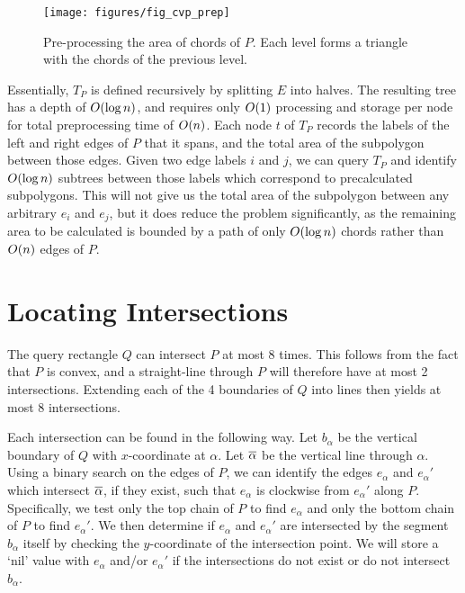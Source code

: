 \begin{figure}[t]
\begin{center}
  \texttt{[image: figures/fig\_cvp\_prep]}
  \caption[Pre-processing the area of chords of $P$.]{Pre-processing the area of chords of $P$.  Each level forms a triangle with the chords of the previous level.}
  \label{fig:convexp:preprocessing}
\end{center}
\end{figure}

Essentially, $T_P$ is defined recursively by splitting $E$ into halves. The resulting tree has a depth of $O\!\left(\log{n}\right)$, and requires only $O\!\left(1\right)$ processing and storage per node for total preprocessing time of $O\!\left(n\right)$. Each node $t$ of $T_P$ records the labels of the left and right edges of $P$ that it spans, and the total area of the subpolygon between those edges. Given two edge labels $i$ and $j$, we can query $T_P$ and identify $O\!\left(\log{n}\right)$ subtrees between those labels which correspond to precalculated subpolygons. This will not give us the total area of the subpolygon between any arbitrary $e_i$ and $e_j$, but it does reduce the problem significantly, as the remaining area to be calculated is bounded by a path of only $O\!\left(\log{n}\right)$ chords rather than $O\!\left(n\right)$ edges of $P$.


\section{Locating Intersections}
\label{:convexp:intersections}

The query rectangle $Q$ can intersect $P$ at most $8$ times. This follows from the fact that $P$ is convex, and a straight-line through $P$ will therefore have at most 2 intersections. Extending each of the 4 boundaries of $Q$ into lines then yields at most 8 intersections.

Each intersection can be found in the following way. 
Let $b_\alpha$ be the vertical boundary of $Q$ with $x$-coordinate at $\alpha$. 
Let $\overline{\alpha}$ be the vertical line through $\alpha$. 
Using a binary search on the edges of $P$, we can identify the edges $e_\alpha$ and $e_\alpha'$ which intersect $\overline{\alpha}$, if they exist, such that $e_\alpha$ is clockwise from $e_\alpha'$ along $P$.
Specifically, we test only the top chain of $P$ to find $e_\alpha$ and only the bottom chain of $P$ to find $e_\alpha'$.
We then determine if $e_\alpha$ and $e_\alpha'$ are intersected by the segment $b_\alpha$ itself by checking the $y$-coordinate of the intersection point. 
We will store a `nil' value with $e_\alpha$ and/or $e_\alpha'$ if the intersections do not exist or do not intersect $b_\alpha$.


